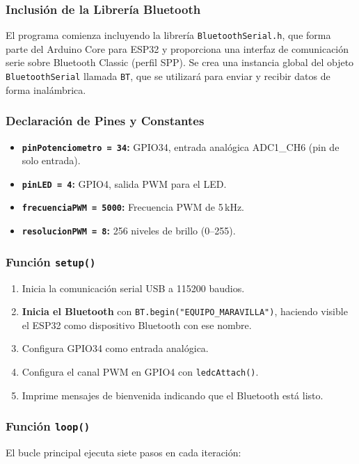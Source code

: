 \documentclass[12pt,a4paper]{article}
\begin{document}
\subsubsection*{Inclusión de la Librería Bluetooth}
El programa comienza incluyendo la librería \texttt{BluetoothSerial.h}, que forma parte del Arduino Core para ESP32 y proporciona una interfaz de comunicación serie sobre Bluetooth Classic (perfil SPP). Se crea una instancia global del objeto \texttt{BluetoothSerial} llamada \texttt{BT}, que se utilizará para enviar y recibir datos de forma inalámbrica.

\subsubsection*{Declaración de Pines y Constantes}
\begin{itemize}
    \item \textbf{\texttt{pinPotenciometro = 34}:} GPIO34, entrada analógica ADC1\_CH6 (pin de solo entrada).
    \item \textbf{\texttt{pinLED = 4}:} GPIO4, salida PWM para el LED.
    \item \textbf{\texttt{frecuenciaPWM = 5000}:} Frecuencia PWM de 5\,kHz.
    \item \textbf{\texttt{resolucionPWM = 8}:} 256 niveles de brillo (0--255).
\end{itemize}

\subsubsection*{Función \texttt{setup()}}
\begin{enumerate}
    \item Inicia la comunicación serial USB a 115200 baudios.
    \item \textbf{Inicia el Bluetooth} con \texttt{BT.begin("EQUIPO\_MARAVILLA")}, haciendo visible el ESP32 como dispositivo Bluetooth con ese nombre.
    \item Configura GPIO34 como entrada analógica.
    \item Configura el canal PWM en GPIO4 con \texttt{ledcAttach()}.
    \item Imprime mensajes de bienvenida indicando que el Bluetooth está listo.
\end{enumerate}

\subsubsection*{Función \texttt{loop()}}
El bucle principal ejecuta siete pasos en cada iteración:
\end{document}
